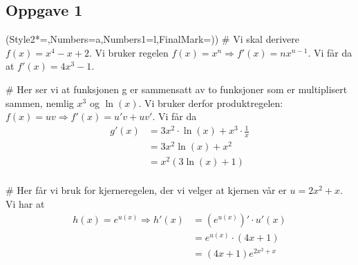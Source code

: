 \subsection*{Oppgave 1}
\begin{easylist}[enumerate]
	\ListProperties(Style2*=,Numbers=a,Numbers1=l,FinalMark={)})
	# Vi skal derivere $f(x) = x^4 - x +2$. Vi bruker regelen $f(x) = x^n \Rightarrow f'(x) = nx^{n-1}$. Vi får da at $f'(x) = 4x^3 - 1$.
	
	# Her ser vi at funksjonen g er sammensatt av to funksjoner som er multiplisert sammen, nemlig $x^3$ og $\ln(x)$. Vi bruker derfor produktregelen: $f(x) = uv \Rightarrow f'(x) = u'v + uv'$. Vi får da 
	\begin{equation*}
		\begin{aligned}
			g'(x) &= 3x^2 \cdot \ln(x) + x^3 \cdot \frac{1}{x}\\
					&= 3x^2\ln(x) + x^2\\
					&= x^2(3\ln(x)+1)\\
		\end{aligned}
	\end{equation*}
	
	# Her får vi bruk for kjerneregelen, der vi velger at kjernen vår er $u = 2x^2 + x$. Vi har at 
	\begin{equation*}
		\begin{aligned}
				h(x) = e^{u(x)} \Rightarrow h'(x) &= (e^{u(x)})' \cdot u'(x) \\
																  &= e^{u(x)} \cdot (4x + 1) \\
																  &= (4x +1)e^{2x^2 + x}
		\end{aligned}
	\end{equation*}
\end{easylist}


